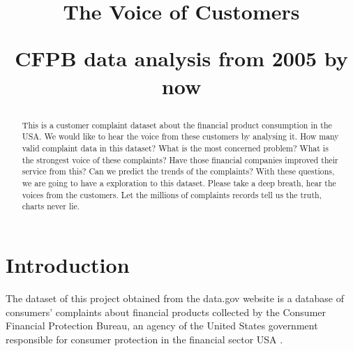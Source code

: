 \documentclass[conference]{IEEEtran}
\begin{document}
\title{The Voice of Customers  \\
\begin{large} 
  CFPB data analysis from 2005 by now
\end{large} 
}

\author{

}

\maketitle

\begin{abstract}
   This is a customer complaint dataset about the financial product consumption in the USA. We would like to hear the voice from these customers by analysing it. How many valid complaint data in this dataset? What is the most concerned problem? What is the strongest voice of these complaints? Have those financial companies improved their service from this? Can we predict the trends of the complaints?
   With these questions, we are going to have a exploration to this dataset. Please take a deep breath, hear the voices from the customers. Let the millions of complaints records tell us the truth, charts never lie.
\end{abstract}


\section{Introduction}

The dataset of this project obtained from the data.gov website is a database of consumers’ complaints about financial products collected by the Consumer Financial Protection Bureau, an agency of the United States government responsible for consumer protection in the financial sector USA \cite{datasource}.
\end{document}
